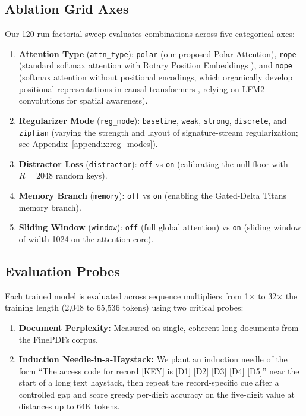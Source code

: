 \documentclass{article} %
\begin{document}
\subsection{Ablation Grid Axes}
Our 120-run factorial sweep evaluates combinations across five categorical axes:
\begin{enumerate}
    \item \textbf{Attention Type} (\texttt{attn\_type}): \texttt{polar} (our proposed Polar Attention), \texttt{rope} (standard softmax attention with Rotary Position Embeddings \citep{rope2021}), and \texttt{nope} (softmax attention without positional encodings, which organically develop positional representations in causal transformers \citep{haviv2022transformer, wang2024length, zuo-etal-2025-position}, relying on LFM2 convolutions for spatial awareness).
    \item \textbf{Regularizer Mode} (\texttt{reg\_mode}): \texttt{baseline}, \texttt{weak}, \texttt{strong}, \texttt{discrete}, and \texttt{zipfian} (varying the strength and layout of signature-stream regularization; see Appendix~\ref{appendix:reg_modes}).
    \item \textbf{Distractor Loss} (\texttt{distractor}): \texttt{off} vs \texttt{on} (calibrating the null floor with $R = 2048$ random keys).
    \item \textbf{Memory Branch} (\texttt{memory}): \texttt{off} vs \texttt{on} (enabling the Gated-Delta Titans memory branch).
    \item \textbf{Sliding Window} (\texttt{window}): \texttt{off} (full global attention) vs \texttt{on} (sliding window of width 1024 on the attention core).
\end{enumerate}

\subsection{Evaluation Probes}
Each trained model is evaluated across sequence multipliers from 1$\times$ to 32$\times$ the training length (2,048 to 65,536 tokens) using two critical probes:
\begin{enumerate}
    \item \textbf{Document Perplexity:} Measured on single, coherent long documents from the FinePDFs corpus. 
    \item \textbf{Induction Needle-in-a-Haystack:} We plant an induction needle of the form ``The access code for record [KEY] is [D1] [D2] [D3] [D4] [D5]'' near the start of a long text haystack, then repeat the record-specific cue after a controlled gap and score greedy per-digit accuracy on the five-digit value at distances up to 64K tokens.
\end{enumerate}
\end{document}
